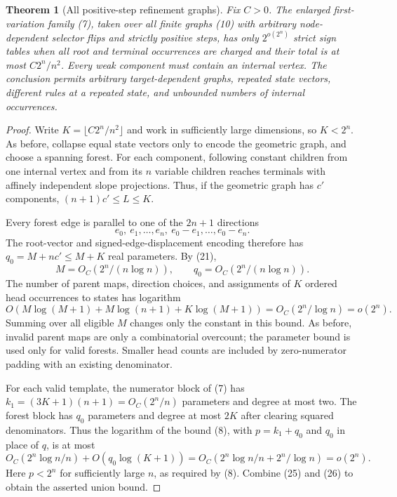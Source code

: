 \documentclass[11pt]{article}
\newtheorem{theorem}{Theorem}
\begin{document}
\begin{theorem}[All positive-step refinement graphs]
Fix $C>0$. The enlarged first-variation family (7), taken over all
finite graphs (10) with arbitrary node-dependent selector flips and
strictly positive steps, has only $2^{o(2^n)}$ strict sign tables when
all root and terminal occurrences are charged and their total is at
most $C2^n/n^2$. Every weak component must contain an internal vertex.
The conclusion permits arbitrary target-dependent graphs, repeated
state vectors, different rules at a repeated state, and unbounded
numbers of internal occurrences.
\end{theorem}
\begin{proof}
Write $K=\lfloor C2^n/n^2\rfloor$ and work in sufficiently large
dimensions, so $K<2^n$. As before, collapse equal state vectors only
to encode the geometric graph, and choose a spanning forest. For each
component, following constant children from one internal vertex and
from its $n$ variable children reaches terminals with affinely independent
slope projections. Thus, if the geometric graph has $c'$ components,
$(n+1)c'\le L\le K$.

Every forest edge is parallel to one of the $2n+1$ directions
\[
                e_0,\ e_1,\ldots,e_n,\ e_0-e_1,\ldots,e_0-e_n.
\]
The root-vector and signed-edge-displacement encoding therefore has
$q_0=M+nc'\le M+K$ real parameters. By (21),
\[
                 M=O_C(2^n/(n\log n)),\qquad
                 q_0=O_C(2^n/(n\log n)). \tag{24}
\]
The number of parent maps, direction choices, and assignments of $K$
ordered head occurrences to states has logarithm
\[
                  O(M\log(M+1)+M\log(n+1)+K\log(M+1))
                       =O_C(2^n/\log n)=o(2^n). \tag{25}
\]
Summing over all eligible $M$ changes only the constant in this bound.
As before, invalid parent maps are only a combinatorial overcount;
the parameter bound is used only for valid forests. Smaller head counts
are included by zero-numerator padding with an existing denominator.

For each valid template, the numerator block of (7) has
$k_1=(3K+1)(n+1)=O_C(2^n/n)$ parameters and degree at most two.
The forest block has $q_0$ parameters and degree at most $2K$
after clearing squared denominators. Thus the logarithm of the
bound (8), with $p=k_1+q_0$ and $q_0$ in place of $q$, is at most
\[
        O_C(2^n\log n/n)+O(q_0\log(K+1))
                   =O_C(2^n\log n/n+2^n/\log n)=o(2^n). \tag{26}
\]
Here $p<2^n$ for sufficiently large $n$, as required by (8).
Combine (25) and (26) to obtain the asserted union bound.
\end{proof}
\end{document}
